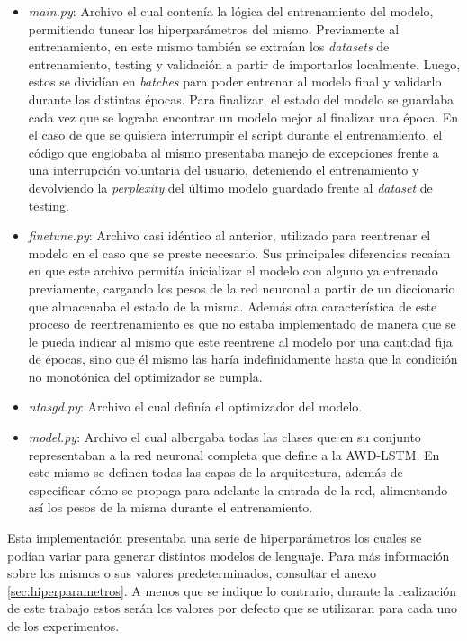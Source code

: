 \begin{itemize}
    \item \textit{main.py}: Archivo el cual contenía la lógica del entrenamiento del modelo, permitiendo tunear los hiperparámetros del mismo. Previamente al entrenamiento, en este mismo también se extraían los \textit{datasets} de entrenamiento, testing y validación a partir de importarlos localmente. Luego, estos se dividían en \textit{batches} para poder entrenar al modelo final y validarlo durante las distintas épocas. Para finalizar, el estado del modelo se guardaba cada vez que se lograba encontrar un modelo mejor al finalizar una época. En el caso de que se quisiera interrumpir el script durante el entrenamiento, el código que englobaba al mismo presentaba manejo de excepciones frente a una interrupción voluntaria del usuario, deteniendo el entrenamiento y devolviendo la \textit{perplexity} del último modelo guardado frente al \textit{dataset} de testing.
    \item \textit{finetune.py}: Archivo casi idéntico al anterior, utilizado para reentrenar el modelo en el caso que se preste necesario. Sus principales diferencias recaían en que este archivo permitía inicializar el modelo con alguno ya entrenado previamente, cargando los pesos de la red neuronal a partir de un diccionario que almacenaba el estado de la misma. Además otra característica de este proceso de reentrenamiento es que no estaba implementado de manera que se le pueda indicar al mismo que este reentrene al modelo por una cantidad fija de épocas, sino que él mismo las haría indefinidamente hasta que la condición no monotónica del optimizador se cumpla.
    \item \textit{ntasgd.py}: Archivo el cual definía el optimizador del modelo.
    \item \textit{model.py}: Archivo el cual albergaba todas las clases que en su conjunto representaban a la red neuronal completa que define a la AWD-LSTM. En este mismo se definen todas las capas de la arquitectura, además de especificar cómo se propaga para adelante la entrada de la red, alimentando así los pesos de la misma durante el entrenamiento.
\end{itemize}

Esta implementación presentaba una serie de hiperparámetros los cuales se podían variar para generar distintos modelos de lenguaje. Para más información sobre los mismos o sus valores predeterminados, consultar el anexo \ref{sec:hiperparametros}. A menos que se indique lo contrario, durante la realización de este trabajo estos serán los valores por defecto que se utilizaran para cada uno de los experimentos.

